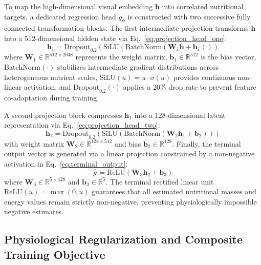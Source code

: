 \documentclass[utf8]{FrontiersinVancouver}
\begin{document}
To map the high-dimensional visual embedding $\mathbf{h}$ into correlated nutritional targets, a dedicated regression head $g_\phi$ is constructed with two successive fully connected transformation blocks. The first intermediate projection transforms $\mathbf{h}$ into a 512-dimensional hidden state via Eq.~\ref{eq:projection_head_one}:
\begin{equation}
    \label{eq:projection_head_one}
    \mathbf{h}_1 = \text{Dropout}_{0.2}\left( \text{SiLU}\left( \text{BatchNorm}\left( \mathbf{W}_1 \mathbf{h} + \mathbf{b}_1 \right) \right) \right)
\end{equation}
where $\mathbf{W}_1 \in \mathbb{R}^{512 \times 2048}$ represents the weight matrix, $\mathbf{b}_1 \in \mathbb{R}^{512}$ is the bias vector, $\text{BatchNorm}(\cdot)$ stabilizes intermediate gradient distributions across heterogeneous nutrient scales, $\text{SiLU}(u) = u \cdot \sigma(u)$ provides continuous non-linear activation, and $\text{Dropout}_{0.2}(\cdot)$ applies a $20\%$ drop rate to prevent feature co-adaptation during training.

A second projection block compresses $\mathbf{h}_1$ into a 128-dimensional latent representation via Eq.~\ref{eq:projection_head_two}:
\begin{equation}
    \label{eq:projection_head_two}
    \mathbf{h}_2 = \text{Dropout}_{0.2}\left( \text{SiLU}\left( \text{BatchNorm}\left( \mathbf{W}_2 \mathbf{h}_1 + \mathbf{b}_2 \right) \right) \right)
\end{equation}
with weight matrix $\mathbf{W}_2 \in \mathbb{R}^{128 \times 512}$ and bias $\mathbf{b}_2 \in \mathbb{R}^{128}$. Finally, the terminal output vector is generated via a linear projection constrained by a non-negative activation in Eq.~\ref{eq:terminal_output}:
\begin{equation}
    \label{eq:terminal_output}
    \hat{\mathbf{y}} = \text{ReLU}\left( \mathbf{W}_3 \mathbf{h}_2 + \mathbf{b}_3 \right)
\end{equation}
where $\mathbf{W}_3 \in \mathbb{R}^{5 \times 128}$ and $\mathbf{b}_3 \in \mathbb{R}^5$. The terminal rectified linear unit $\text{ReLU}(u) = \max(0, u)$ guarantees that all estimated nutritional masses and energy values remain strictly non-negative, preventing physiologically impossible negative estimates.

\subsection{Physiological Regularization and Composite Training Objective}
\end{document}
